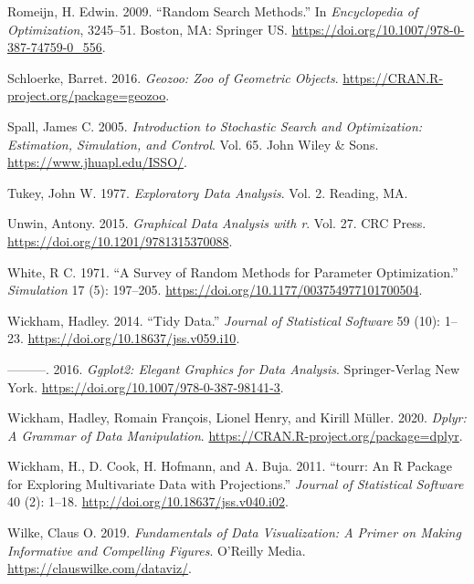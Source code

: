 \begin{CSLReferences}{1}{0}
\leavevmode{}%
Romeijn, H. Edwin. 2009. {``Random Search Methods.''} In \emph{Encyclopedia of Optimization}, 3245--51. Boston, MA: Springer US. \url{https://doi.org/10.1007/978-0-387-74759-0_556}.

\leavevmode{}%
Schloerke, Barret. 2016. \emph{Geozoo: Zoo of Geometric Objects}. \url{https://CRAN.R-project.org/package=geozoo}.

\leavevmode{}%
Spall, James C. 2005. \emph{Introduction to Stochastic Search and Optimization: Estimation, Simulation, and Control}. Vol. 65. John Wiley \& Sons. \url{https://www.jhuapl.edu/ISSO/}.

\leavevmode{}%
Tukey, John W. 1977. \emph{Exploratory Data Analysis}. Vol. 2. Reading, MA.

\leavevmode{}%
Unwin, Antony. 2015. \emph{Graphical Data Analysis with r}. Vol. 27. CRC Press. \url{https://doi.org/10.1201/9781315370088}.

\leavevmode{}%
White, R C. 1971. {``A Survey of Random Methods for Parameter Optimization.''} \emph{Simulation} 17 (5): 197--205. \url{https://doi.org/10.1177/003754977101700504}.

\leavevmode{}%
Wickham, Hadley. 2014. {``Tidy Data.''} \emph{Journal of Statistical Software} 59 (10): 1--23. \url{https://doi.org/10.18637/jss.v059.i10}.

\leavevmode{}%
---------. 2016. \emph{Ggplot2: Elegant Graphics for Data Analysis}. Springer-Verlag New York. \url{https://doi.org/10.1007/978-0-387-98141-3}.

\leavevmode{}%
Wickham, Hadley, Romain François, Lionel Henry, and Kirill Müller. 2020. \emph{Dplyr: A Grammar of Data Manipulation}. \url{https://CRAN.R-project.org/package=dplyr}.

\leavevmode{}%
Wickham, H., D. Cook, H. Hofmann, and A. Buja. 2011. {``{tourr}: An {R} Package for Exploring Multivariate Data with Projections.''} \emph{Journal of Statistical Software} 40 (2): 1--18. \url{http://doi.org/10.18637/jss.v040.i02}.

\leavevmode{}%
Wilke, Claus O. 2019. \emph{Fundamentals of Data Visualization: A Primer on Making Informative and Compelling Figures}. O{'}Reilly Media. \url{https://clauswilke.com/dataviz/}.


\end{CSLReferences}

